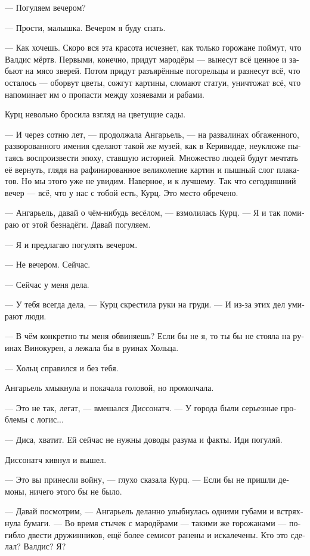 \documentclass[a4paper,12pt,fleqn]{book}\usepackage{cooltooltips}\usepackage{polyglossia}\setdefaultlanguage[babelshorthands=true]{russian}\setotherlanguage{english}\defaultfontfeatures{Ligatures=TeX,Mapping=tex-text} \usepackage{xcolor}\definecolor{lightgray}{HTML}{bbbbbb}\color{lightgray}\newcommand{\ml}[3]{\textenglish{\textcolor{black}{#3}}}
\newcommand{\asterism}{\vspace{1em}{\centering\Large\bfseries$\ast~\ast~\ast$\par}\vspace{1em}}
\begin{document}
--- Погуляем вечером?

--- Прости, малышка.
Вечером я буду спать.

--- Как хочешь.
Скоро вся эта красота исчезнет, как только горожане поймут, что Валдис мёртв.
Первыми, конечно, придут мародёры --- вынесут всё ценное и забьют на мясо зверей.
Потом придут разъярённые погорельцы и разнесут всё, что осталось --- оборвут цветы, сожгут картины, сломают статуи, уничтожат всё, что напоминает им о пропасти между хозяевами и рабами.

Курц невольно бросила взгляд на цветущие сады.

--- И через сотню лет, --- продолжала Ангарьель, --- на развалинах обгаженного, разворованного имения сделают такой же музей, как в Керивидде, неуклюже пытаясь воспроизвести эпоху, ставшую историей.
Множество людей будут мечтать её вернуть, глядя на рафинированное великолепие картин и пышный слог плакатов.
Но мы этого уже не увидим.
Наверное, и к лучшему.
Так что сегодняшний вечер --- всё, что у нас с тобой есть, Курц.
Это место обречено.

--- Ангарьель, давай о чём-нибудь весёлом, --- взмолилась Курц.
--- Я и так помираю от этой безнадёги.
Давай погуляем.

--- Я и предлагаю погулять вечером.

--- Не вечером.
Сейчас.

--- Сейчас у меня дела.

--- У тебя всегда дела, --- Курц скрестила руки на груди.
--- И из-за этих дел умирают люди.

--- В чём конкретно ты меня обвиняешь?
Если бы не я, то ты бы не стояла на руинах Винокурен, а лежала бы в руинах Хольца.

--- Хольц справился и без тебя.

Ангарьель хмыкнула и покачала головой, но промолчала.

--- Это не так, легат, --- вмешался Диссонатч.
--- У города были серьезные проблемы с логис...

--- Диса, хватит.
Ей сейчас не нужны доводы разума и факты.
Иди погуляй.

Диссонатч кивнул и вышел.

\asterism

--- Это вы принесли войну, --- глухо сказала Курц.
--- Если бы не пришли демоны, ничего этого бы не было.

--- Давай посмотрим, --- Ангарьель деланно улыбнулась одними губами и встряхнула бумаги.
--- Во время стычек с мародёрами --- такими же горожанами --- погибло двести дружинников, ещё более семисот ранены и искалечены.
Кто это сделал?
Валдис?
Я?
\end{document}
